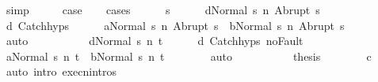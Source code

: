 \begin{isabellebody}
\ simp\isanewline
\ \ \isamarkupfalse%
\ \isamarkupfalse%
\ {\isacharquery}case\isanewline
\ \ \isamarkupfalse%
\ {\isacharparenleft}cases{\isacharparenright}\isanewline
\ \ \ \ \isamarkupfalse%
\ s{\isacharprime}\isanewline
\ \ \ \ \isamarkupfalse%
\ {\isachardoublequoteopen}{\isasymGamma}{\isasymturnstile}{\isasymlangle}d{}{\isacharcomma}Normal\ s{\isasymrangle}\ {\isacharequal}n{\isasymRightarrow}\ Abrupt\ s{\isacharprime}{\isachardoublequoteclose}\isanewline
\ \ \ \ \isamarkupfalse%
\ d{}\ Catch{\isachardot}hyps\isanewline
\ \ \ \ \isamarkupfalse%
\ {\isachardoublequoteopen}{\isasymGamma}{\isasymturnstile}{\isasymlangle}a{}{\isacharcomma}Normal\ s{\isasymrangle}\ {\isacharequal}n{\isasymRightarrow}\ Abrupt\ s{\isacharprime}{\isachardoublequoteclose}\ \ {\isachardoublequoteopen}{\isasymGamma}{\isasymturnstile}{\isasymlangle}b{}{\isacharcomma}Normal\ s{\isasymrangle}\ {\isacharequal}n{\isasymRightarrow}\ Abrupt\ s{\isacharprime}{\isachardoublequoteclose}\isanewline
\ \ \ \ \ \ \isamarkupfalse%
\ auto\isanewline
\ \ \ \ \isamarkupfalse%
\isanewline
\ \ \ \ \isamarkupfalse%
\ {\isachardoublequoteopen}{\isasymGamma}{\isasymturnstile}{\isasymlangle}d{}{\isacharcomma}Normal\ s{\isacharprime}{\isasymrangle}\ {\isacharequal}n{\isasymRightarrow}\ t{\isachardoublequoteclose}\isanewline
\ \ \ \ \isamarkupfalse%
\ d{}\ Catch{\isachardot}hyps\ noFault\isanewline
\ \ \ \ \isamarkupfalse%
\ {\isachardoublequoteopen}{\isasymGamma}{\isasymturnstile}{\isasymlangle}a{}{\isacharcomma}Normal\ s{\isacharprime}{\isasymrangle}\ {\isacharequal}n{\isasymRightarrow}\ t{\isachardoublequoteclose}\ \ {\isachardoublequoteopen}{\isasymGamma}{\isasymturnstile}{\isasymlangle}b{}{\isacharcomma}Normal\ s{\isacharprime}{\isasymrangle}\ {\isacharequal}n{\isasymRightarrow}\ t{\isachardoublequoteclose}\isanewline
\ \ \ \ \ \ \isamarkupfalse%
\ auto\isanewline
\ \ \ \ \isamarkupfalse%
\isanewline
\ \ \ \ \isamarkupfalse%
\ {\isacharquery}thesis\isanewline
\ \ \ \ \ \ \isamarkupfalse%
\ c{}\ \isamarkupfalse%
\ {\isacharparenleft}auto\ intro{\isacharcolon}\ execn{\isachardot}intros{\isacharparenright}\isanewline
\ \ \isamarkupfalse%
\isanewline

\end{isabellebody}
